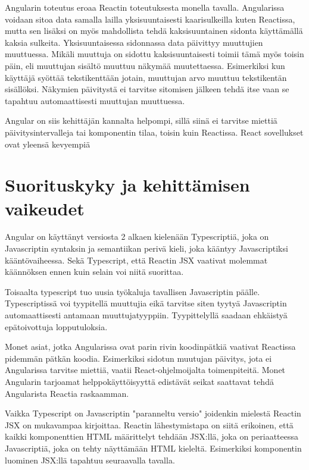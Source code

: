 \documentclass[a4paper,12pt,twoside]{article} %
\begin{document}
\vspace{4mm}\noindent
Angularin toteutus eroaa Reactin toteutuksesta monella tavalla. Angularissa voidaan sitoa data samalla lailla yksisuuntaisesti kaarisulkeilla kuten Reactissa, mutta sen lisäksi on myös mahdollista tehdä kaksisuuntainen sidonta käyttämällä kaksia sulkeita. Yksisuuntaisessa sidonnassa data päivittyy muuttujien muuttuessa. Mikäli muuttuja on sidottu kaksisuuntaisesti toimii tämä myös toisin päin, eli muuttujan sisältö muuttuu näkymää muutettaessa. Esimerkiksi kun käyttäjä syöttää tekstikenttään jotain, muuttujan arvo muuttuu tekstikentän sisällöksi. Näkymien päivitystä ei tarvitse sitomisen jälkeen tehdä itse vaan se tapahtuu automaattisesti muuttujan muuttuessa.

\vspace{4mm}\noindent
Angular on siis kehittäjän kannalta helpompi, sillä siinä ei tarvitse miettiä päivitysintervalleja tai komponentin tilaa, toisin kuin Reactissa. React sovellukset ovat yleensä kevyempiä 


\newpage

\section{Suorituskyky ja kehittämisen vaikeudet}

Angular on käyttänyt versiosta 2 alkaen kielenään Typescriptiä, joka on Javascriptin syntaksin ja semantiikan perivä kieli, joka kääntyy Javascriptiksi kääntövaiheessa. Sekä Typescript, että Reactin JSX vaativat molemmat käännöksen ennen kuin selain voi niitä suorittaa.\cite{typescript}

\vspace{4mm}\noindent
Toisaalta typescript tuo uusia työkaluja tavallisen Javascriptin päälle. Typescriptissä voi tyypitellä muuttujia eikä tarvitse siten tyytyä Javascriptin automaattisesti antamaan muuttujatyyppiin. Tyypittelyllä saadaan ehkäistyä epätoivottuja lopputuloksia.

\vspace{4mm}\noindent
Monet asiat, jotka Angularissa ovat parin rivin koodinpätkiä vaativat Reactissa pidemmän pätkän koodia. Esimerkiksi sidotun muutujan päivitys, jota ei Angularissa tarvitse miettiä, vaatii React-ohjelmoijalta toimenpiteitä. Monet Angularin tarjoamat helppokäyttöisyyttä edistävät seikat saattavat tehdä Angularista Reactia raskaamman.

\vspace{4mm}\noindent
Vaikka Typescript on Javascriptin "paranneltu versio" joidenkin mielestä Reactin JSX on mukavampaa kirjoittaa. Reactin lähestymistapa on siitä erikoinen, että kaikki komponenttien HTML määrittelyt tehdään JSX:llä, joka on periaatteessa Javascriptiä, joka on tehty näyttämään HTML kieleltä. Esimerkiksi komponentin luominen JSX:llä tapahtuu seuraavalla tavalla.
\end{document}
